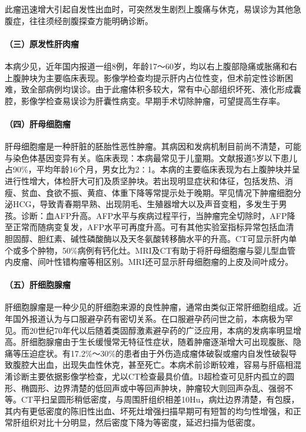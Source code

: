 此瘤迅速增大引起自发性出血时，可突然发生剧烈上腹痛与休克，易误诊为其他急腹症，往往须经剖腹探查方能明确诊断。

\paragraph{（三）原发性肝肉瘤}

本病少见，近年国内报道一组8例，年龄17～60岁，均以右上腹部隐痛或胀痛和右上腹肿块为主要临床表现。影像学检查均提示肝内占位性变，但术前定性诊断困难，致全部病例均误诊。由于此瘤体积多较大，常有中心部组织坏死、液化形成囊腔，影像学检查易误诊为肝囊性病变。早期手术切除肿瘤，可望提高生存率。

\paragraph{（四）肝母细胞瘤}

肝母细胞瘤是一种肝脏的胚胎性恶性肿瘤。其病因和发病机制目前尚不清楚，可能与染色体基因变异有关。临床表现：本病最常见于儿童期。文献报道5岁以下患儿占90\%，平均年龄16个月，男女比为2∶1。本病的主要临床表现为右上腹肿块并呈进行性增大，体检肝大可扪及质坚肿块。若出现明显症状和体征，包括发热、消瘦、贫血、食欲不振、黄疸、体重下降等常提示处于晚期。罕见情况下肿瘤细胞分泌HCG，导致青春期早熟、出现阴毛、生殖器增大以及声音变粗，多发生于男孩。诊断：血AFP升高。AFP水平与疾病过程平行，当肿瘤完全切除时，AFP降至正常而随病变复发，AFP水平可再度升高。可有其他实验室指标异常包括血清胆固醇、胆红素、碱性磷酸酶以及天冬氨酸转移酶水平的升高。CT可显示肝内单个或多个肿物，50\%病例有钙化灶。MRI及CT有助于将肝母细胞瘤与婴儿型血管内皮瘤、间叶性错构瘤等相区别。MRI还可显示肝母细胞瘤的上皮及间叶成分。

\paragraph{（五）肝细胞腺瘤}

肝细胞腺瘤是一种少见的肝细胞来源的良性肿瘤，通常由类似正常肝细胞组成。近年国外报道认为与口服避孕药有密切关系。在口服避孕药问世之前，本病极为罕见。而20世纪70年代以后随着类固醇激素避孕药的广泛应用，本病的发病率明显增高。肝细胞腺瘤由于生长缓慢常无特征性症状，随着肿瘤逐渐增大可出现腹胀、隐痛等压迫症状。有17.2\%～30\%的患者由于外伤造成瘤体破裂或瘤内自发性破裂导致腹腔大出血，出现失血性休克，甚至死亡。本病术前诊断较难，容易与肝癌相混淆诊断主要依据影像学检查，尤以CT检查最具价值。B超检查可见肝内孤立的圆形、椭圆形、边界清楚的低回声或中等回声肿块，肿瘤较大则回声杂乱、强弱不等。CT平扫呈圆形稍低密度，与周围肝组织相差10Hu，病灶边界清楚，有包膜，其内有更低密度的陈旧性出血、坏死灶增强扫描早期可有短暂的均匀性增强，和正常肝组织对比十分明显，然后密度下降为等密度，延迟扫描为低密度。

